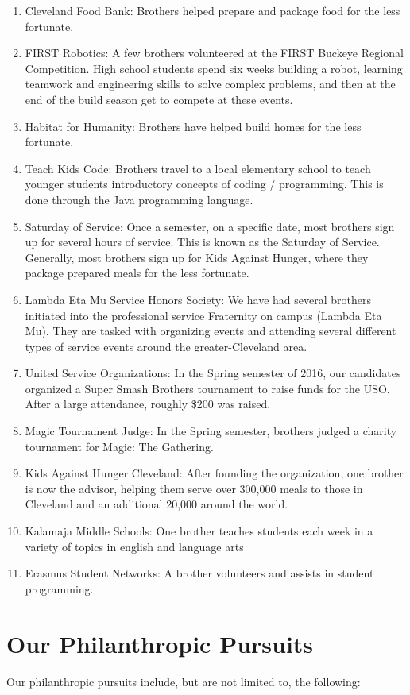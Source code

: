 \begin{enumerate}
      \item Cleveland Food Bank: Brothers helped prepare and package food for the less fortunate.
      \item FIRST Robotics: A few brothers volunteered at the FIRST Buckeye Regional Competition. High school students spend six weeks building a robot, learning teamwork and engineering skills to solve complex problems, and then at the end of the build season get to compete at these events.
      \item Habitat for Humanity: Brothers have helped build homes for the less fortunate.
      \item Teach Kids Code: Brothers travel to a local elementary school to teach younger students introductory concepts of coding / programming. This is done through the Java programming language.
      \item Saturday of Service: Once a semester, on a specific date, most brothers sign up for several hours of service. This is known as the Saturday of Service. Generally, most brothers sign up for Kids Against Hunger, where they package prepared meals for the less fortunate.
      \item Lambda Eta Mu Service Honors Society: We have had several brothers initiated into the professional service Fraternity on campus (Lambda Eta Mu). They are tasked with organizing events and attending several different types of service events around the greater-Cleveland area.
      \item United Service Organizations: In the Spring semester of 2016, our candidates organized a Super Smash Brothers tournament to raise funds for the USO. After a large attendance, roughly \$200 was raised.
      \item Magic Tournament Judge: In the Spring semester, brothers judged a charity tournament for Magic: The Gathering.
      \item Kids Against Hunger Cleveland: After founding the organization, one brother is now the advisor, helping them serve over 300,000 meals to those in Cleveland and an additional 20,000 around the world.
      \item Kalamaja Middle Schools: One brother teaches students each week in a variety of topics in english and language arts
      \item Erasmus Student Networks: A brother volunteers and assists in student programming.
      \end{enumerate}
      
    \section*{Our Philanthropic Pursuits}
      Our philanthropic pursuits include, but are not limited to, the following:
      
